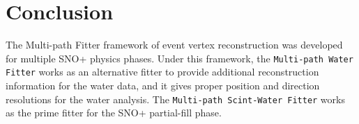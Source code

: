 \section{Conclusion}
The Multi-path Fitter framework of event vertex reconstruction was developed for multiple SNO+ physics phases. Under this framework, the \texttt{Multi-path Water Fitter} works as an alternative fitter to provide additional reconstruction information for the water data, and it gives proper position and direction resolutions for the water analysis. The \texttt{Multi-path Scint-Water Fitter} works as the prime fitter for the SNO+ partial-fill phase.